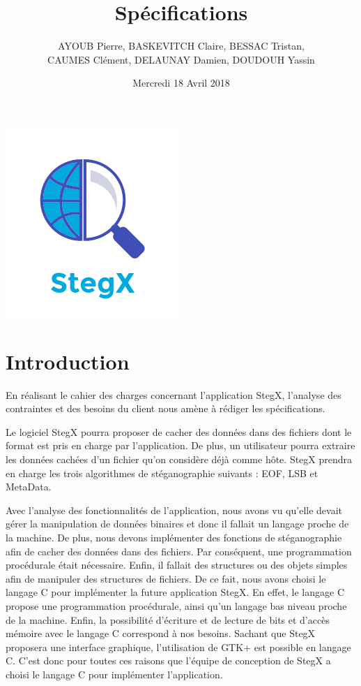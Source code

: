 \documentclass[11pt]{article}
\title{\huge{\textbf Spécifications}}
\author{AYOUB Pierre, BASKEVITCH Claire, BESSAC Tristan, \\
CAUMES Clément, DELAUNAY Damien, DOUDOUH Yassin}
\date{Mercredi 18 Avril 2018}
\begin{document}
\maketitle
\vspace{20em}
\begin{center}\includegraphics{pictures/Application.png}\end{center}
\newpage

\tableofcontents

\newpage

\section{Introduction}

En réalisant le cahier des charges concernant l'application StegX, 
l'analyse des contraintes et des besoins du client nous amène à rédiger 
les spécifications. 

Le logiciel StegX pourra proposer de cacher des données dans des fichiers 
dont le format est pris en charge par l'application. De plus, un utilisateur 
pourra extraire les données cachées d'un fichier qu'on considère déjà comme 
hôte. StegX prendra en charge les trois algorithmes de stéganographie suivants : 
EOF, LSB et MetaData. 

Avec l'analyse des fonctionnalités de l'application, nous avons vu qu'elle 
devait gérer la manipulation de données binaires et donc il fallait un 
langage proche de la machine. 
De plus, nous devons implémenter des fonctions de stéganographie afin de 
cacher des données dans des fichiers. Par conséquent, une programmation 
procédurale était nécessaire. 
Enfin, il fallait des structures ou des objets simples afin de manipuler 
des structures de fichiers. 
De ce fait, nous avons choisi le langage C pour implémenter la future 
application StegX. En effet, le langage C propose une programmation procédurale, 
ainsi qu'un langage bas niveau proche de la machine. Enfin, la possibilité 
d'écriture et de lecture de bits et d'accès mémoire avec le langage C correspond 
à nos besoins. 
Sachant que StegX proposera une interface graphique, l'utilisation de GTK+ 
est possible en langage C. 
C'est donc pour toutes ces raisons que l'équipe de conception de StegX a 
choisi le langage C pour implémenter l'application. 
\end{document}
